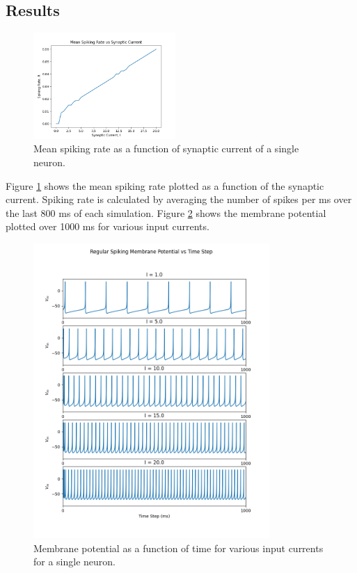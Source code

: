 \documentclass[a4paper, 11pt, titlepage]{article}
\newcommand{\figRef}[1]{Figure \ref{#1}}
\begin{document}
  \subsection{Results}
  \begin{figure}
    \centering
    \vspace{-44pt}
    \includegraphics[width=0.48\textwidth]{images/spike_rate_single.png}
    \vspace{-10pt}
    \caption{
      Mean spiking rate as a function of synaptic current of a single neuron.
    }
    \vspace{-22pt}
    \label{fig:rSingle}
  \end{figure}
  \figRef{fig:rSingle} shows the mean spiking rate plotted as a function of the
  synaptic current.
  Spiking rate is calculated by averaging the number of spikes per ms over the
  last 800 ms of each simulation.
  \figRef{fig:vSingle} shows the membrane potential plotted over 1000 ms for
  various input currents.
  \begin{figure}[ht]
    \centering
    \includegraphics[width=0.8\textwidth]{images/v_mem_plot_single.png}
    \vspace{-20pt}
    \caption{
      Membrane potential as a function of time for various input currents for a
      single neuron.
    }
    \label{fig:vSingle}
  \end{figure}
\end{document}
